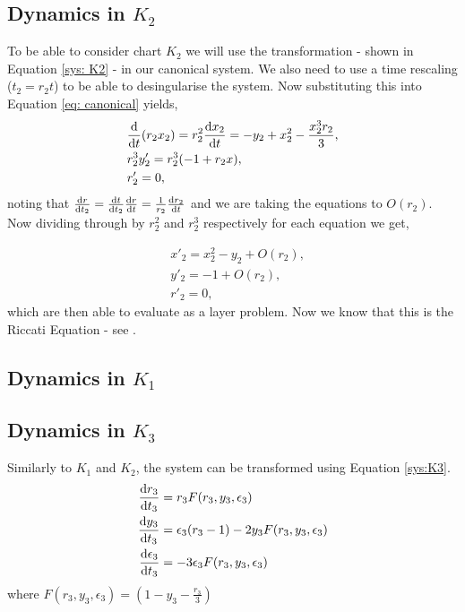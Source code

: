\documentclass{article}
\begin{document}
\subsection{Dynamics in \texorpdfstring{$K_2$}{K2}} \label{sec: VDP K_2}
To be able to consider chart $ K_2 $ %
we will use the transformation - shown in Equation \ref{sys: K2} - in our canonical system. We also need to use a time rescaling ($ t_2=r_2t $) to be able to desingularise the system. Now substituting this into Equation \ref{eq: canonical} yields,
\begin{align}
&\od{}{t}(r_2x_2)=r_2^2\od{x_2}{t}=-y_2+x_2^2-\dfrac{x_2^3r_2}{3},\\
&r^3_2y'_2=r^3_2(-1+r_2x),\\
&r'_2=0,
\end{align}
noting that $ \od{r}{t_2}=\od{t}{t_2}\od{r}{t}=\frac{1}{r_2}\od{r_2}{t} $ and we are taking the equations to $ O(r_2) $. Now dividing through by $ r^2_2 $ and $ r^3_2 $ respectively for each equation we get,

\begin{equation}
	\begin{aligned}
		&x'_2=x^2_2-y_2+O(r_2),\\
		&y'_2=-1+O(r_2),\\
		&r'_2=0,
	\end{aligned}
\end{equation}
which are then able to evaluate as a layer problem. Now we know that this is the Riccati Equation - see \citet{Riccati}.

\subsection{Dynamics in \texorpdfstring{$K_1$}{K1}}

\subsection{Dynamics in \texorpdfstring{$K_3$}{K3}}
Similarly to $K_1$ and $K_2$, the system can be transformed using Equation \ref{sys:K3}.
\begin{align*}
\od{r_3}{t_3}&=r_3F(r_3,y_3,\epsilon_3)\\
\od{y_3}{t_3}&=\epsilon_3(r_3-1)-2y_3F(r_3,y_3,\epsilon_3)\\
\od{\epsilon_3}{t_3}&=-3\epsilon_3F(r_3,y_3,\epsilon_3)
\end{align*}
where $F(r_3,y_3,\epsilon_3)=\left(1-y_3-\frac{r_3}{3}\right)$
\newpage
\end{document}
